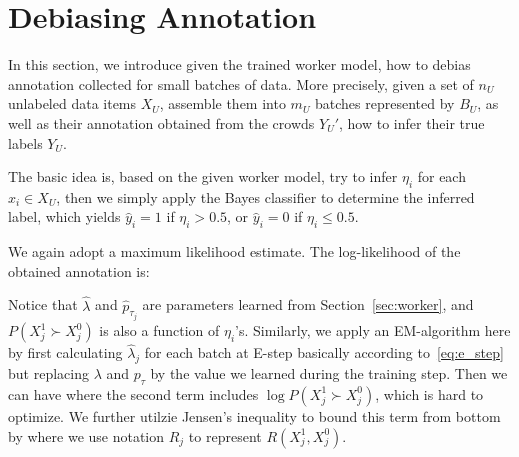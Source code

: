 \section{Debiasing Annotation}
\label{sec:debias}

In this section, we introduce given the trained worker model, 
how to debias annotation collected for small batches of data.  
More precisely, given a set of $n_U$ unlabeled data items $X_U$,
assemble them into $m_U$ batches represented by $B_U$,  
as well as their annotation obtained from the crowds $Y_U'$,
how to infer their true labels $Y_U$.  

The basic idea is, based on the given worker model,
try to infer $\eta_i$ for each $x_i \in X_U$,
then we simply apply the Bayes classifier to determine the inferred label, 
which yields $\hat{y}_i = 1$ if $\eta_i > 0.5$, or $\hat{y}_i = 0$ if $\eta_i \leq 0.5$.  

We again adopt a maximum likelihood estimate.  
The log-likelihood of the obtained annotation is:
%

Notice that $\hat{\lambda}$ and $\hat{p}_{\tau_j}$ are parameters learned from Section~\ref{sec:worker},
and $P(X_{j}^1 \succ X_{j}^0)$ is also a function of $\eta_{i}$'s.  
Similarly, we apply an EM-algorithm here 
by first calculating $\hat{\lambda}_j$ for each batch at E-step basically according to~\eqref{eq:e_step} 
but replacing $\lambda$ and $p_{\tau}$ by the value we learned during the training step.  
Then we can have
%
where the second term includes $\log P(X_{j}^1 \succ X_{j}^0)$, which is hard to optimize.  
We further utilzie Jensen's inequality to bound this term from bottom by
%
where we use notation $R_j$ to represent $R(X_{j}^1, X_{j}^0)$.  

